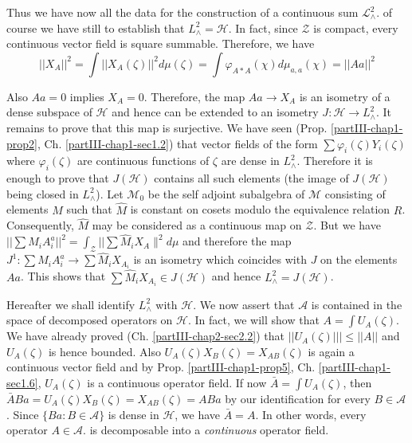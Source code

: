 Thus we have now all the data for the construction of a continuous sum
$\mathscr{L}^{2}_{\wedge}$. of course we have still to establish that
$L^{2}_{\wedge}=\mathscr{H}$. In fact, since $\mathcal{Z}$ is compact,
every continuous vector field is square summable. Therefore, we have 
$$
||X_A||^2=\int||X_A(\zeta)||^2d \mu (\zeta)=\int
\varphi_{A*A}(\chi)d\mu_{a,a}(\chi)=||Aa||^2 
$$

Also $Aa=0$ implies $X_A=0$. Therefore, the map $Aa\to X_A$ is an
isometry of a dense subspace of $\mathscr{H}$ and hence can be
extended to an isometry $J :\mathscr{H}\to L^2_{\wedge}$. It remains
to prove that this map is surjective. We have seen
(Prop. \ref{partIII-chap1-prop2}, Ch. \ref{partIII-chap1-sec1.2})  
that vector fields of the form $\sum \varphi_i (\zeta) Y_i(\zeta)$
where $\varphi_i(\zeta)$ are continuous functions of $\zeta$ are dense
in $L^2_{\wedge}$. Therefore it is enough to prove that
$J(\mathscr{H})$ contains all such elements (the image of
$J(\mathscr{H})$ being closed in $L^2_{\wedge}$). Let $\mathscr{M}_0$ be the
self adjoint subalgebra of $\mathscr{M}$ consisting of elements $M$ such that
$\hat{M}$ is constant on cosets modulo the equivalence relation
$R$. Consequently, $\hat{M}$ may be considered as a continuous map on
$\mathcal{Z}$. But we have $||\sum M_i A_i^a||^2= \int_{\mathcal{Z}}
||\sum \hat{M}_{i} X_{A} \|^2 d\mu$ and therefore the map $J^1 : \sum
M_i A_i^a \to \sum \hat{M}_i X_{A_i}$ is an isometry which
coincides\pageoriginale 
with $J$ on the elements $Aa$. This shows that $\sum
\hat{M}_{i}X_{A_{i}}\in J(\mathscr{H})$ and hence
$L^{2}_{\wedge}=J(\mathscr{H})$.  

Hereafter we shall identify $L^2_{\wedge}$ with $\mathscr{H}$. We now
assert that $\mathcal{A}$ is contained in the space of decomposed
operators on $\mathscr{H}$. In fact, we will show that $A= \int U_A
(\zeta)$. We have already proved (Ch. \ref{partIII-chap2-sec2.2}) that
$||U_A (\zeta) |||\le 
||A||$ and $U_A(\zeta)$ is hence bounded. Also $U_A
(\zeta)X_B(\zeta)=X_{AB}(\zeta)$ is again a continuous vector field
and by Prop. \ref{partIII-chap1-prop5},
Ch. \ref{partIII-chap1-sec1.6}, $U_A(\zeta)$ is a 
continuous operator 
field. If now $\bar{A} = \int U_A (\zeta)$, then $ \bar{A}
Ba=U_A(\zeta)X_B(\zeta)=X_{AB}(\zeta)=ABa$ by our identification for
every $B\in \mathcal{A}$.  Since  $\{Ba : B \in \mathcal{A}\}$ is
dense in $\mathscr{H}$, we have $\bar{A}=A$. In other words, every
operator $A \in \mathcal{A}$. is decomposable into a
\textit{continuous} operator field. 

